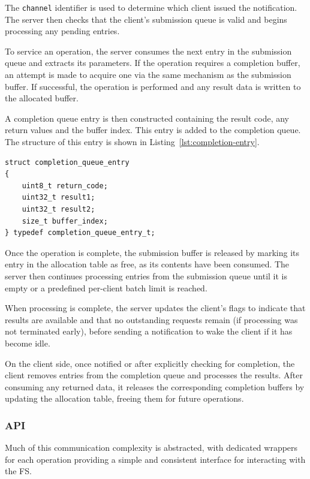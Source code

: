 The \texttt{channel} identifier is used to determine which client issued the notification. The server then checks that the client’s submission queue is valid and begins processing any pending entries. 

To service an operation, the server consumes the next entry in the submission queue and extracts its parameters. If the operation requires a completion buffer, an attempt is made to acquire one via the same mechanism as the submission buffer. If successful, the operation is performed and any result data is written to the allocated buffer. 

A completion queue entry is then constructed containing the result code, any return values and the buffer index. This entry is added to the completion queue. The structure of this entry is shown in Listing~\ref{lst:completion-entry}.

\vspace{0.4cm}
\begin{lstlisting}[caption={Completion entry structure.}, label={lst:completion-entry}]
struct completion_queue_entry
{
    uint8_t return_code;
    uint32_t result1;
    uint32_t result2;
    size_t buffer_index;
} typedef completion_queue_entry_t;
\end{lstlisting}

Once the operation is complete, the submission buffer is released by marking its entry in the allocation table as free, as its contents have been consumed. The server then continues processing entries from the submission queue until it is empty or a predefined per-client batch limit is reached.

When processing is complete, the server updates the client’s flags to indicate that results are available and that no outstanding requests remain (if processing was not terminated early), before sending a notification to wake the client if it has become idle.

On the client side, once notified or after explicitly checking for completion, the client removes entries from the completion queue and processes the results. After consuming any returned data, it releases the corresponding completion buffers by updating the allocation table, freeing them for future operations. 

\subsubsection{API}

Much of this communication complexity is abstracted, with dedicated wrappers for each operation providing a simple and consistent interface for interacting with the FS. 


